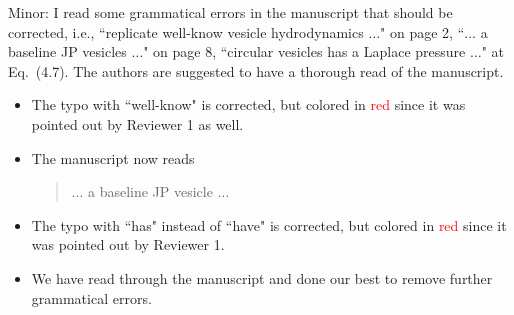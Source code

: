 \documentclass[11pt]{article}
\newcommand{\comment}[1]{{\color{blue} #1}}
\begin{document}
\noindent
\comment{Minor: I read some grammatical errors in the manuscript that
should be corrected, i.e., ``replicate well-know vesicle hydrodynamics
$\ldots$" on page 2, ``$\ldots$ a baseline JP vesicles $\ldots$" on page
8, ``circular vesicles has a Laplace pressure $\ldots$" at Eq.~(4.7).
The authors are suggested to have a thorough read of the manuscript.}
\begin{itemize}
  \item The typo with ``well-know" is corrected, but colored in
    \textcolor{red}{red} since it was pointed out by Reviewer 1 as well.

  \item The manuscript now reads
    \begin{quotation}
      $\ldots$ a baseline JP vesicle $\ldots$
    \end{quotation}

  \item The typo with ``has" instead of ``have" is corrected, but
    colored in \textcolor{red}{red} since it was pointed out by Reviewer
    1.

  \item We have read through the manuscript and done our best to
    remove further grammatical errors.

\end{itemize}
\end{document}
